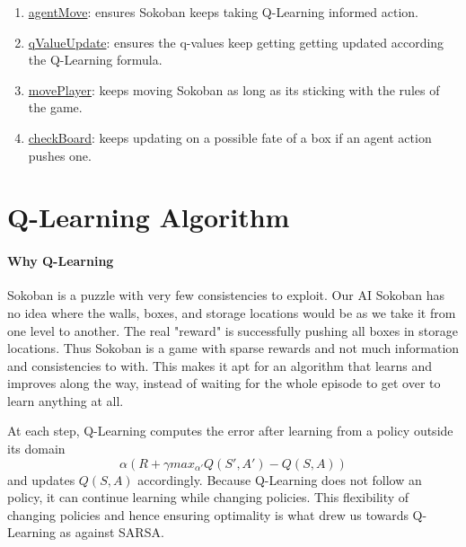 \documentclass{article}
\begin{document}
\begin{enumerate}[label=\alph*)]
    \item \underline{agentMove}: ensures Sokoban keeps taking Q-Learning informed action.
    \item \underline{qValueUpdate}: ensures the q-values keep getting getting updated according the Q-Learning formula. 
    \item \underline{movePlayer}: keeps moving Sokoban as long as its sticking with the rules of the game.
    \item \underline{checkBoard}: keeps updating on a possible fate of a box if an agent action pushes one.
\end{enumerate}

\section{Q-Learning Algorithm}

\paragraph{Why Q-Learning}
Sokoban is a puzzle with very few consistencies to exploit. Our AI Sokoban has no idea where the walls, boxes, and storage locations would be as we take it from one level to another. The real "reward" is successfully pushing all boxes in storage locations. Thus Sokoban is a game with sparse rewards and not much information and consistencies to with. This makes it apt for an algorithm that learns and improves along the way, instead of waiting for the whole episode to get over to learn anything at all.

At each step, Q-Learning computes the error after learning from a policy outside its domain $$\alpha(R + \gamma max_{\alpha'}Q(S',A') - Q(S,A))$$ 
and updates $Q(S,A)$ accordingly. Because Q-Learning does not follow an policy, it can continue learning while changing policies. This flexibility of changing policies and hence ensuring optimality is what drew us towards Q-Learning as against SARSA. 
\end{document}
